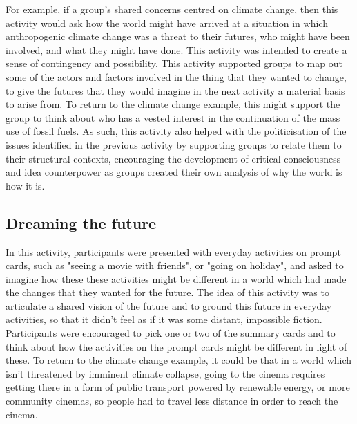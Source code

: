 For example, if a group's shared concerns centred on climate change, then this activity would ask how the world might have arrived at a situation in which anthropogenic climate change was a threat to their futures, who might have been involved, and what they might have done. This activity was intended to create a sense of contingency and possibility. This activity supported groups to map out some of the actors and factors involved in the thing that they wanted to change, to give the futures that they would imagine in the next activity a material basis to arise from. To return to the climate change example, this might support the group to think about who has a vested interest in the continuation of the mass use of fossil fuels. As such, this activity also helped with the politicisation of the issues identified in the previous activity by supporting groups to relate them to their structural contexts, encouraging the development of critical consciousness and idea counterpower as groups created their own analysis of why the world is how it is. 
 
\subsection{Dreaming the future}
In this activity, participants were presented with everyday activities on prompt cards, such as "seeing a movie with friends", or "going on holiday", and asked to imagine how these these activities might be different in a world which had made the changes that they wanted for the future. The idea of this activity was to articulate a shared vision of the future and to ground this future in everyday activities, so that it didn't feel as if it was some distant, impossible fiction. Participants were encouraged to pick one or two of the summary cards and to think about how the activities on the prompt cards might be different in light of these. To return to the climate change example, it could be that in a world which isn’t threatened by imminent climate collapse, going to the cinema requires getting there in a form of public transport powered by renewable energy, or more community cinemas, so people had to travel less distance in order to reach the cinema.

